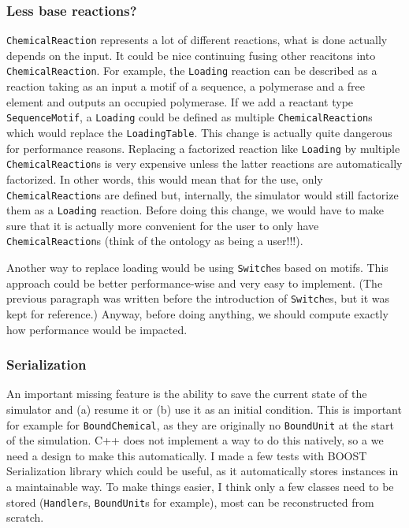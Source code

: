 \subsubsection{Less base reactions?}

\texttt{ChemicalReaction} represents a lot of different reactions, what is done actually depends on the input. It could be nice continuing fusing other reacitons into \texttt{ChemicalReaction}. For example, the \texttt{Loading} reaction can be described as a reaction taking as an input a motif of a sequence, a polymerase and a free element and outputs an occupied polymerase. If we add a reactant type \texttt{SequenceMotif}, a \texttt{Loading} could be defined as multiple \texttt{ChemicalReaction}s which would replace the \texttt{LoadingTable}. This change is actually quite dangerous for performance reasons. Replacing a factorized reaction like \texttt{Loading} by multiple \texttt{ChemicalReaction}s is very expensive unless the latter reactions are automatically factorized. In other words, this would mean that for the use, only \texttt{ChemicalReaction}s are defined but, internally, the simulator would still factorize them as a \texttt{Loading} reaction. Before doing this change, we would have to make sure that it is actually more convenient for the user to only have \texttt{ChemicalReaction}s (think of the ontology as being a user!!!).

Another way to replace loading would be using \texttt{Switch}es based on motifs. This approach could be better performance-wise and very easy to implement. (The previous paragraph was written before the introduction of \texttt{Switch}es, but it was kept for reference.) Anyway, before doing anything, we should compute exactly how performance would be impacted.

\subsubsection{Serialization}

An important missing feature is the ability to save the current state of the simulator and (a) resume it or (b) use it as an initial condition. This is important for example for \texttt{BoundChemical}, as they are originally no \texttt{BoundUnit} at the start of the simulation. C++ does not implement a way to do this natively, so a we need a design to make this automatically. I made a few tests with BOOST Serialization library which could be useful, as it automatically stores instances in a maintainable way. To make things easier, I think only a few classes need to be stored (\texttt{Handler}s, \texttt{BoundUnit}s for example), most can be reconstructed from scratch.

